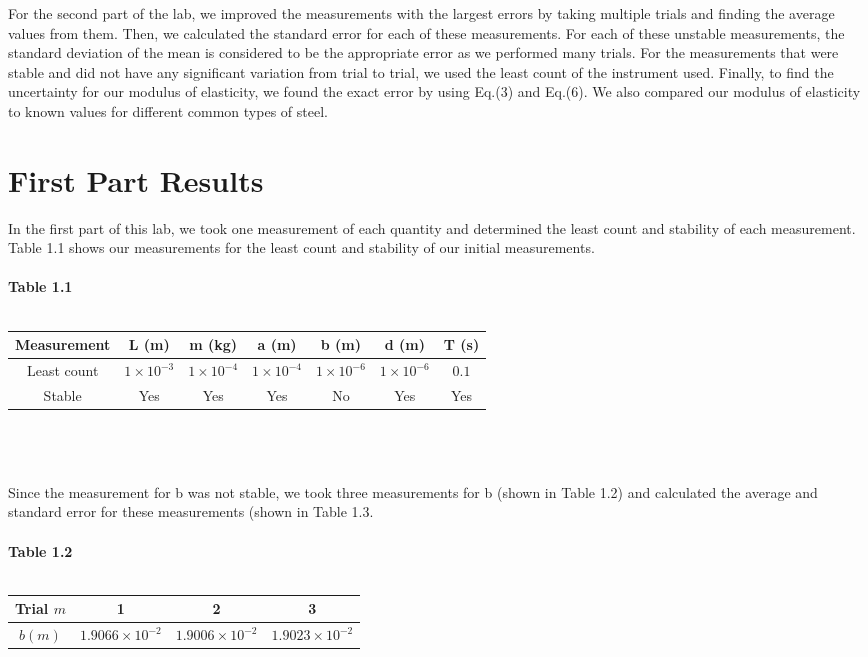 \documentclass[12pt, leqno]{article}
\begin{document}
For the second part of the lab, we improved the measurements with the largest errors by taking multiple trials and finding the average values from them.  Then, we calculated the standard error for each of these measurements.  For each of these unstable measurements, the standard deviation of the mean is considered to be the appropriate error as we performed many trials.  For the measurements that were stable and did not have any significant variation from trial to trial, we used the least count of the instrument used.  Finally, to find the uncertainty for our modulus of elasticity, we found the exact error by using Eq.(3) and Eq.(6).  We also compared our modulus of elasticity to known values for different common types of steel. 
\section*{First Part Results}
In the first part of this lab, we took one measurement of each quantity and determined the least count and stability of each measurement.  Table 1.1 shows our measurements for the least count and stability of our initial measurements.\\\\
\textbf{Table 1.1}\\\\
\begin{tabular}{|c|c|c|c|c|c|c|}
	\hline
	Measurement & L (m)& m (kg)& a (m)& b (m)& d (m)& T (s)\\
	\hline
	Least count & $1 \times 10^{-3}$ & $1\times 10^{-4}$ & $1 \times 10^{-4}$ & $1 \times 10^{-6}$ & $1 \times 10^{-6}$ & $0.1$\\
	\hline
	Stable & Yes & Yes & Yes & No & Yes & Yes\\
	\hline
\end{tabular}\\\\\\
Since the measurement for b was not stable, we took three measurements for b (shown in Table 1.2) and calculated the average and standard error for these measurements (shown in Table 1.3.\\\\
\textbf{Table 1.2}\\\\
\begin{tabular}{|c|c|c|c|}
	\hline
	Trial $m$ & 1 & 2 & 3\\
	\hline
	$b (m)$ & $1.9066 \times 10^{-2}$ & $1.9006 \times 10^{-2}$ & $1.9023 \times 10^{-2}$\\
	\hline
\end{tabular}\\\\\\
\end{document}
